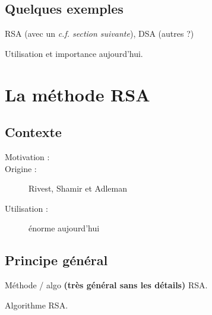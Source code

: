 \documentclass[a4paper,11pt]{article}
\begin{document}
\subsection{Quelques exemples}

RSA (avec un {\em c.f. section suivante}), DSA (autres ?)

Utilisation et importance aujourd'hui.


\section{La méthode RSA}


\subsection{Contexte}


\begin{description}
\item [Motivation :]

\item [Origine : ] Rivest, Shamir et Adleman


\item [Utilisation : ] énorme aujourd'hui


\end{description}


\subsection{Principe général}


Méthode / algo {\bf (très général sans les détails)} RSA.

\begin{center}
\begin{algorithm}
\caption{Algorithme RSA.}
\label{etiquette_de_l_algo_pour_y_faire_reference_plus_tard}
\end{algorithm}
\end{center}
\end{document}
